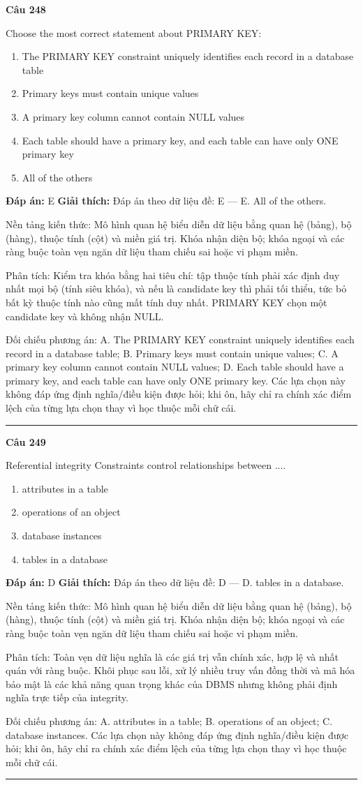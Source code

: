\documentclass[11pt,a4paper]{article}
\newenvironment{question}[1]{%
  \par\vspace{1em}\noindent\textbf{\large Câu #1}\par\vspace{0.4em}
}{%
  \par\vspace{1em}\hrule\vspace{0.6em}
}
\newenvironment{choices}{%
  \begin{enumerate}[label=\textbf{\Alph*.},leftmargin=2.2em,itemsep=2pt,topsep=3pt]
}{%
  \end{enumerate}
}
\newcommand{\choice}{\item}
\begin{document}
\begin{question}{248}
Choose the most correct statement about PRIMARY KEY:
\begin{choices}
\choice The PRIMARY KEY constraint uniquely identifies each record in a database table
\choice Primary keys must contain unique values
\choice A primary key column cannot contain NULL values
\choice Each table should have a primary key, and each table can have only ONE primary key
\choice All of the others
\end{choices}
\textbf{Đáp án:} E
\textbf{Giải thích:} Đáp án theo dữ liệu đề: E — E. All of the others.

Nền tảng kiến thức: Mô hình quan hệ biểu diễn dữ liệu bằng quan hệ (bảng), bộ (hàng), thuộc tính (cột) và miền giá trị. Khóa nhận diện bộ; khóa ngoại và các ràng buộc toàn vẹn ngăn dữ liệu tham chiếu sai hoặc vi phạm miền.

Phân tích: Kiểm tra khóa bằng hai tiêu chí: tập thuộc tính phải xác định duy nhất mọi bộ (tính siêu khóa), và nếu là candidate key thì phải tối thiểu, tức bỏ bất kỳ thuộc tính nào cũng mất tính duy nhất. PRIMARY KEY chọn một candidate key và không nhận NULL.

Đối chiếu phương án: A. The PRIMARY KEY constraint uniquely identifies each record in a database table; B. Primary keys must contain unique values; C. A primary key column cannot contain NULL values; D. Each table should have a primary key, and each table can have only ONE primary key. Các lựa chọn này không đáp ứng định nghĩa/điều kiện được hỏi; khi ôn, hãy chỉ ra chính xác điểm lệch của từng lựa chọn thay vì học thuộc mỗi chữ cái.
\end{question}

\begin{question}{249}
Referential integrity Constraints control relationships between ....
\begin{choices}
\choice attributes in a table
\choice operations of an object
\choice database instances
\choice tables in a database
\end{choices}
\textbf{Đáp án:} D
\textbf{Giải thích:} Đáp án theo dữ liệu đề: D — D. tables in a database.

Nền tảng kiến thức: Mô hình quan hệ biểu diễn dữ liệu bằng quan hệ (bảng), bộ (hàng), thuộc tính (cột) và miền giá trị. Khóa nhận diện bộ; khóa ngoại và các ràng buộc toàn vẹn ngăn dữ liệu tham chiếu sai hoặc vi phạm miền.

Phân tích: Toàn vẹn dữ liệu nghĩa là các giá trị vẫn chính xác, hợp lệ và nhất quán với ràng buộc. Khôi phục sau lỗi, xử lý nhiều truy vấn đồng thời và mã hóa bảo mật là các khả năng quan trọng khác của DBMS nhưng không phải định nghĩa trực tiếp của integrity.

Đối chiếu phương án: A. attributes in a table; B. operations of an object; C. database instances. Các lựa chọn này không đáp ứng định nghĩa/điều kiện được hỏi; khi ôn, hãy chỉ ra chính xác điểm lệch của từng lựa chọn thay vì học thuộc mỗi chữ cái.
\end{question}
\end{document}
